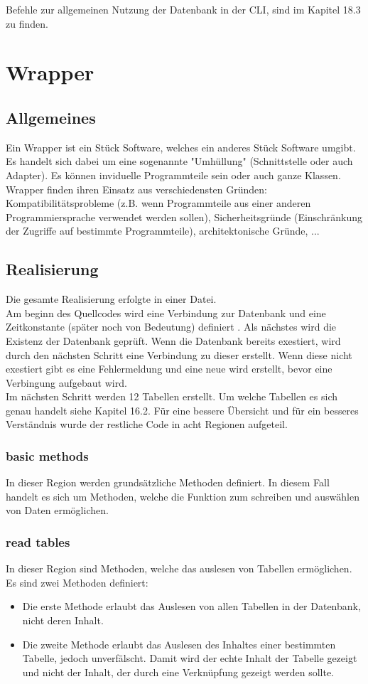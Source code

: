 \documentclass[12pt,a4paper]{report}
\begin{document}
\begin{onehalfspace}
Befehle zur allgemeinen Nutzung der Datenbank in der CLI, sind im Kapitel 18.3 zu finden.

\section{Wrapper}
\subsection{Allgemeines}
Ein Wrapper ist ein Stück Software, welches ein anderes Stück Software umgibt. Es handelt sich dabei um eine sogenannte "{}Umhüllung"{} (Schnittstelle oder auch Adapter). Es können inviduelle Programmteile sein oder auch ganze Klassen.\\
Wrapper finden ihren Einsatz aus verschiedensten Gründen: Kompatibilitätsprobleme (z.B. wenn Programmteile aus einer anderen Programmiersprache verwendet werden sollen), Sicherheitsgründe (Einschränkung der Zugriffe auf bestimmte Programmteile), architektonische Gründe, ...

\subsection{Realisierung}
Die gesamte Realisierung erfolgte in einer Datei.
\\Am beginn des Quellcodes wird eine Verbindung zur Datenbank und eine Zeitkonstante (später noch von Bedeutung) definiert . Als nächstes wird die Existenz der Datenbank geprüft. Wenn die Datenbank bereits exestiert, wird durch den nächsten Schritt eine Verbindung zu dieser erstellt.
Wenn diese nicht exestiert gibt es eine Fehlermeldung und eine neue wird erstellt, bevor eine Verbingung aufgebaut wird.\\
Im nächsten Schritt werden 12 Tabellen erstellt. Um welche Tabellen es sich genau handelt siehe Kapitel 16.2.
Für eine bessere Übersicht und für ein besseres Verständnis wurde der restliche Code in acht Regionen aufgeteil.
\subsubsection{basic methods}
In dieser Region werden grundsätzliche Methoden definiert. In diesem Fall handelt es sich um Methoden, welche die Funktion zum schreiben und auswählen von Daten ermöglichen.
\subsubsection{read tables}
In dieser Region sind Methoden, welche das auslesen von Tabellen ermöglichen.
Es sind zwei Methoden definiert:
\begin{itemize}
\item Die erste Methode erlaubt das Auslesen von allen Tabellen in der Datenbank, nicht deren Inhalt.
\item Die zweite Methode erlaubt das Auslesen des Inhaltes einer bestimmten Tabelle, jedoch unverfälscht. Damit wird der echte Inhalt der Tabelle gezeigt und nicht der Inhalt, der durch eine Verknüpfung gezeigt werden sollte.
\end{itemize}

\end{onehalfspace}
\end{document}
